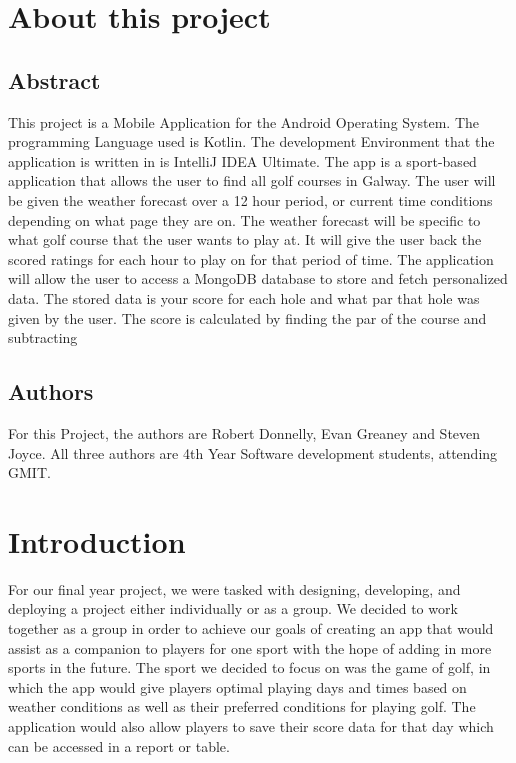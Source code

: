 \chapter{About this project}
\section{Abstract}
This project is a Mobile Application for the Android Operating System. The programming Language used is Kotlin. The development Environment that the application is written in is IntelliJ IDEA Ultimate.\newline
The app is a sport-based application that allows the user to find all golf courses in Galway. The user will be given the weather forecast over a 12 hour period, or current time conditions depending on what page they are on. The weather forecast will be specific to what golf course that the user wants to play at. It will give the user back the scored ratings for each hour to play on for that period of time.\newline
The application will allow the user to access a MongoDB database to store and fetch personalized data. The stored data is your score for each hole and what par that hole was given by the user. The score is calculated by finding the par of the course and subtracting \newline
\section{Authors}
For this Project, the authors are Robert Donnelly, Evan Greaney and Steven Joyce. All three authors are 4th Year Software development students, attending GMIT.
\chapter{Introduction}
For our final year project, we were tasked with designing, developing, and deploying a project either individually or as a group. We decided to work together as a group in order to achieve our goals of creating an app that would assist as a companion to players for one sport with the hope of adding in more sports in the future. The sport we decided to focus on was the game of golf, in which the app would give players optimal playing days and times based on weather conditions as well as their preferred conditions for playing golf. The application would also allow players to save their score data for that day which can be accessed in a report or table.


